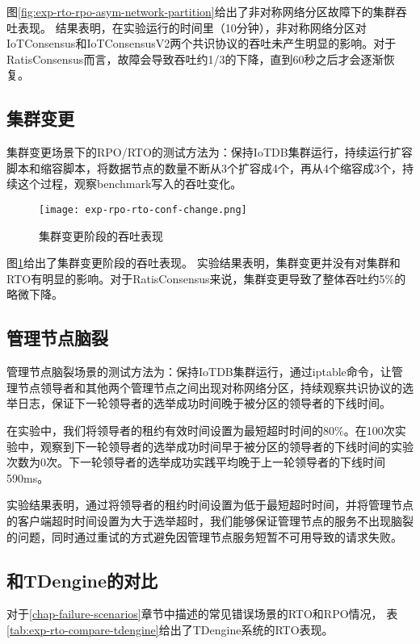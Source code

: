 图\ref{fig:exp-rto-rpo-asym-network-partition}给出了非对称网络分区故障下的集群吞吐表现。
结果表明，在实验运行的时间里（10分钟），非对称网络分区对IoTConsensus和IoTConsensusV2两个共识协议的吞吐未产生明显的影响。对于RatisConsensus而言，故障会导致吞吐约1/3的下降，直到60秒之后才会逐渐恢复。

\subsection{集群变更}

集群变更场景下的RPO/RTO的测试方法为：保持IoTDB集群运行，持续运行扩容脚本和缩容脚本，将数据节点的数量不断从3个扩容成4个，再从4个缩容成3个，持续这个过程，观察benchmark写入的吞吐变化。


\begin{figure}
    \centering
    \texttt{[image: exp-rpo-rto-conf-change.png]}
    \caption{集群变更阶段的吞吐表现}
    \label{fig:exp-rpo-rto-conf-change}
\end{figure}

图\ref{fig:exp-rpo-rto-conf-change}给出了集群变更阶段的吞吐表现。
实验结果表明，集群变更并没有对集群和RTO有明显的影响。对于RatisConsensus来说，集群变更导致了整体吞吐约5\%的略微下降。

\subsection{管理节点脑裂}

管理节点脑裂场景的测试方法为：保持IoTDB集群运行，通过iptable命令，让管理节点领导者和其他两个管理节点之间出现对称网络分区，持续观察共识协议的选举日志，保证下一轮领导者的选举成功时间晚于被分区的领导者的下线时间。

在实验中，我们将领导者的租约有效时间设置为最短超时时间的80\%。在100次实验中，观察到下一轮领导者的选举成功时间早于被分区的领导者的下线时间的实验次数为0次。下一轮领导者的选举成功实践平均晚于上一轮领导者的下线时间590ms。

实验结果表明，通过将领导者的租约时间设置为低于最短超时时间，并将管理节点的客户端超时时间设置为大于选举超时，我们能够保证管理节点的服务不出现脑裂的问题，同时通过重试的方式避免因管理节点服务短暂不可用导致的请求失败。

\subsection{和TDengine的对比}

对于\ref{chap-failure-scenarios}章节中描述的常见错误场景的RTO和RPO情况，
表\ref{tab:exp-rto-compare-tdengine}给出了TDengine系统的RTO表现。

